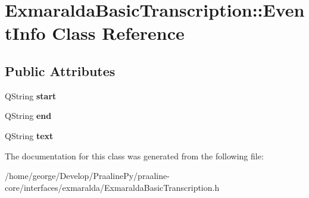 \hypertarget{class_exmaralda_basic_transcription_1_1_event_info}{}\section{Exmaralda\+Basic\+Transcription\+:\+:Event\+Info Class Reference}
\label{class_exmaralda_basic_transcription_1_1_event_info}
\subsection*{Public Attributes}
\begin{DoxyCompactItemize}
\item 
\mbox{\label{class_exmaralda_basic_transcription_1_1_event_info_ae589a11137f4c1e617c6e3fc4dda339e}} 
Q\+String {\bfseries start}
\item 
\mbox{\label{class_exmaralda_basic_transcription_1_1_event_info_a86f307afc2e024c2dc91e96da1221afc}} 
Q\+String {\bfseries end}
\item 
\mbox{\label{class_exmaralda_basic_transcription_1_1_event_info_a7f217e4556fa89b6ff07f7788ef35002}} 
Q\+String {\bfseries text}
\end{DoxyCompactItemize}


The documentation for this class was generated from the following file\+:\begin{DoxyCompactItemize}
\item 
/home/george/\+Develop/\+Praaline\+Py/praaline-\/core/interfaces/exmaralda/Exmaralda\+Basic\+Transcription.\+h\end{DoxyCompactItemize}
